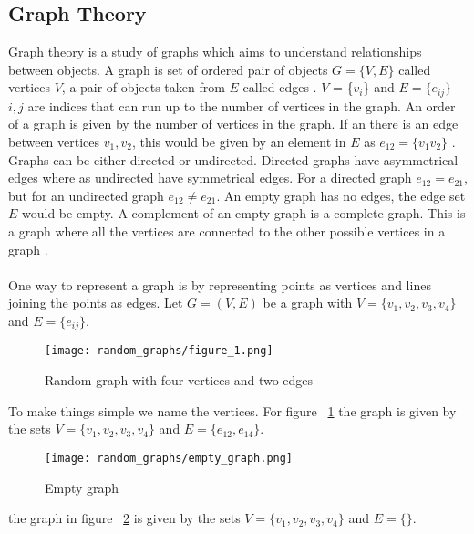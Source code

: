 \documentclass{Assignment}
\begin{document}
\subsection{Graph Theory}
Graph theory is a study of graphs which aims to understand relationships between objects. 
A graph is set of ordered pair of objects $G = \{V,E\}$ called vertices $V$, a pair of objects taken from $E$ called edges \cite{BondyMurty2008}.
$V$ = \{$v_i$\} and $E=\{e_{ij}\}$ $i,j$ are indices that can run up to the number of vertices in the graph. 
An order of a graph is given by the number of vertices in the graph.
If an there is an edge between vertices $v_1 ,v_2$, this would be given by an element in $E$ as $e_{12}=\{v_1v_2\}$ \cite{BondyMurty2008}.
Graphs can be either directed or undirected. 
Directed graphs have asymmetrical edges where as undirected have symmetrical edges.
For a directed graph $e_{12} = e_{21}$, but for an undirected graph $e_{12} \neq e_{21}$.
An empty graph has no edges, the edge set $E$ would be empty.
A complement of an empty graph is a complete graph.
This is a graph where all the vertices are connected to the other possible vertices in a graph \cite{reducible_graph_theory}.
\\\\
One way to represent a graph is by representing points as vertices and lines joining the points as edges.
Let $G = (V,E)$ be a graph with $V = \{v_1, v_2, v_3, v_4\}$ and $ E=\{e_{ij}\}.$
\begin{figure}[H]
	\centering
	\texttt{[image: random\_graphs/figure\_1.png]}
	\caption{Random graph with four vertices and two edges}
	\label{random_graph}
\end{figure}
To make things simple we name the vertices.
For figure ~\ref{random_graph} the graph is given by the sets  $V = \{v_1, v_2, v_3, v_4\}$ and $E=\{e_{12},e_{14}\}.$
\begin{figure}[H]
	\centering
	\texttt{[image: random\_graphs/empty\_graph.png]}
	\caption{Empty graph}
	\label{empty_graph}
\end{figure}
the graph in figure ~\ref{empty_graph} is given by the sets  $V = \{v_1, v_2, v_3, v_4\}$ and $E=\{\}.$
\end{document}
